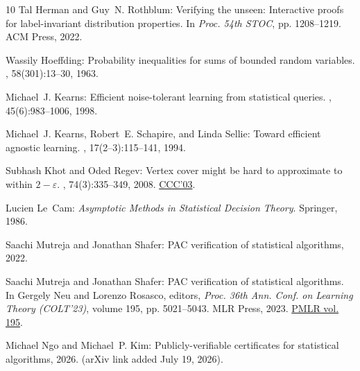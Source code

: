\documentclass[11pt]{article}
\begin{document}
\begin{thebibliography}{10}
{\sc Tal Herman and Guy~N. Rothblum}: Verifying the unseen: {I}nteractive
  proofs for label-invariant distribution properties.
\newblock In {\em Proc. 54th STOC}, pp. 1208--1219. ACM Press, 2022.
\newblock [\epfmtdoi{10.1145/3519935.3519987}]

{\sc Wassily Hoeffding}: Probability inequalities for sums of bounded random
  variables.
, 58(301):13--30, 1963.
\newblock [\epfmtdoi{10.2307/2282952}]

{\sc Michael~J. Kearns}: Efficient noise-tolerant learning from statistical
  queries.
, 45(6):983--1006, 1998.
\newblock [\epfmtdoi{10.1145/293347.293351}]

{\sc Michael~J. Kearns, Robert~E. Schapire, and Linda Sellie}: Toward efficient
  agnostic learning.
, 17(2--3):115--141, 1994.
\newblock [\epfmtdoi{10.1007/BF00993468}]

{\sc Subhash Khot and Oded Regev}: Vertex cover might be hard to approximate to
  within $2-\varepsilon$.
, 74(3):335--349, 2008.
\newblock \prelim \href{https://doi.org/10.1109/CCC.2003.1214437}{CCC'03}.

{\sc Lucien Le~Cam}: {\em Asymptotic Methods in Statistical Decision Theory}.
\newblock Springer, 1986.
\newblock [\epfmtdoi{10.1007/978-1-4612-4946-7}]

{\sc Saachi Mutreja and Jonathan Shafer}: {PAC} verification of statistical
  algorithms, 2022.

{\sc Saachi Mutreja and Jonathan Shafer}: {PAC} verification of statistical
  algorithms.
\newblock In {\sc Gergely Neu and Lorenzo Rosasco}, editors, {\em Proc. 36th
  Ann. Conf. on Learning Theory (COLT'23)}, volume 195, pp. 5021--5043. MLR
  Press, 2023.
\newblock \href{https://proceedings.mlr.press/v195/mutreja23a.html}{PMLR vol.
  195}.

{\sc Michael Ngo and Michael~P. Kim}: Publicly-verifiable certificates for
  statistical algorithms, 2026.
\newblock (arXiv link added July 19, 2026).


\end{thebibliography}
\end{document}
